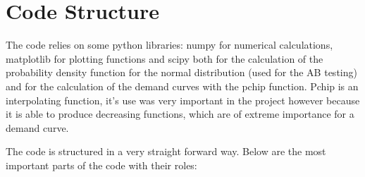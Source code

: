 \newpage
\section{Code Structure}\label{sec:code-structure}

The code relies on some python libraries: numpy for numerical calculations, matplotlib for plotting functions and scipy both for the calculation of the probability density function for the normal distribution (used for the AB testing) and for the calculation of the demand curves with the pchip function. Pchip is an interpolating function, it's use was very important in the project however because it is able to produce decreasing functions, which are of extreme importance for a demand curve.


The code is structured in a very straight forward way. Below are the most important parts of the code with their roles:
